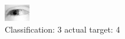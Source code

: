 \begin{figure}[h!]
\begin{center}
\includegraphics[width=0.60\columnwidth]{figures/ID2437_class_3_target_4.png}
\end{center}
\caption{ Classification: 3 actual target: 4}
\label{fig:ID2437_class_3_target_4}
\end{figure}
